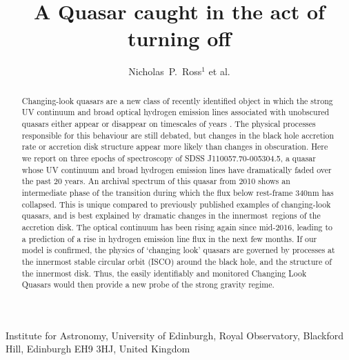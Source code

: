 \documentclass{nature}
\title{A Quasar caught in the act of turning off}
\author{Nicholas~P.~Ross$^{1}$ et al.}
\begin{document}
\maketitle

\begin{affiliations}
  \item Institute for Astronomy, University of Edinburgh, Royal Observatory, Blackford Hill, Edinburgh EH9 3HJ, United Kingdom 
\end{affiliations}


\begin{abstract}
Changing-look quasars are a new class of recently identified object in
which the strong UV continuum and broad optical hydrogen emission
lines associated with unobscured quasars either appear or disappear on
timescales of years \cite{LaMassa15, Runnoe16, MacLeod16, Ruan16}. The
physical processes responsible for this behaviour are still debated,
but changes in the black hole accretion rate or accretion disk
structure appear more likely than changes in
obscuration\cite{Hutsemekers17, Sheng17}. Here we report on three
epochs of spectroscopy of SDSS J110057.70-005304.5, a quasar whose UV
continuum and broad hydrogen emission lines have dramatically faded
over the past 20 years. An archival spectrum of this quasar from 2010
shows an intermediate phase of the transition during which the flux
below rest-frame 340nm has collapsed. This is unique compared to
previously published examples of changing-look quasars, and is best
explained by dramatic changes in the innermost regions of the
accretion disk. The optical continuum has been rising again since
mid-2016, leading to a prediction of a rise in hydrogen emission line
flux in the next few months. If our model is confirmed, the physics of
`changing look' quasars are governed by processes at the innermost
stable circular orbit (ISCO) around the black hole, and the structure
of the innermost disk. Thus, the easily identifiably and monitored
Changing Look Quasars would then provide a new probe of the strong
gravity regime.
\end{abstract}
\end{document}
